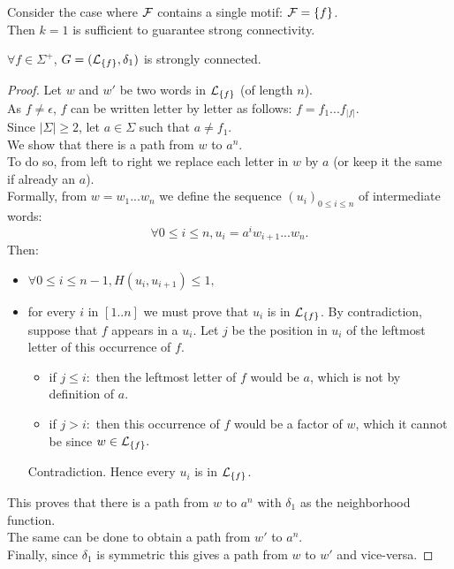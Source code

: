 \documentclass{article}
\begin{document}
	Consider the case where $\mathcal{F}$ contains a single motif: $\mathcal{F} = \{f\}$. \\
	Then $k = 1$ is sufficient to guarantee strong connectivity.
	\begin{result}
		$\forall f \in \Sigma^+$, $G = (\mathcal{L}_{\{f\}}, \delta_1)$ is strongly connected.
	\end{result}
	\begin{proof}
		Let $w$ and $w'$ be two words in $\mathcal{L}_{\{f\}}$ (of length $n$). \\
		As $f \neq \epsilon$, $f$ can be written letter by letter as follows: $f = f_1 ... f_{|f|}$. \\
		Since $|\Sigma| \geq 2$, let $a \in \Sigma$ such that $a \neq f_1$. \\
		We show that there is a path from $w$ to $a^n$. \\
		To do so, from left to right we replace each letter in $w$ by $a$ (or keep it the same if already an $a$). \\
		Formally, from $w = w_1 ... w_n$ we define the sequence $(u_i)_{0 \leq i \leq n}$ of intermediate words:
		$$ \forall 0 \leq i \leq n, u_i = a^i w_{i+1} ... w_n.$$
		Then:
		\begin{itemize}
			\item $\forall 0 \leq i \leq n - 1, H(u_i, u_{i+1}) \leq 1,$
			\item for every $i$ in $[1..n]$ we must prove that $u_i$ is in $\mathcal{L}_{\{f\}}$. By contradiction, suppose that $f$ appears in a $u_i$. Let $j$ be the position in $u_i$ of the leftmost letter of this occurrence of $f$.
			\begin{itemize}
				\item if $j \leq i:$ then the leftmost letter of $f$ would be $a$, which is not by definition of $a$.
				\item if $j > i:$ then this occurrence of $f$ would be a factor of $w$, which it cannot be since $w \in \mathcal{L}_{\{f\}}.$
			\end{itemize}
			Contradiction. Hence every $u_i$ is in $\mathcal{L}_{\{f\}}$.
		\end{itemize}
		This proves that there is a path from $w$ to $a^n$ with $\delta_1$ as the neighborhood function. \\
		The same can be done to obtain a path from $w'$ to $a^n$. \\
		Finally, since $\delta_1$ is symmetric this gives a path from $w$ to $w'$ and vice-versa.	
	\end{proof}
	
\end{document}
